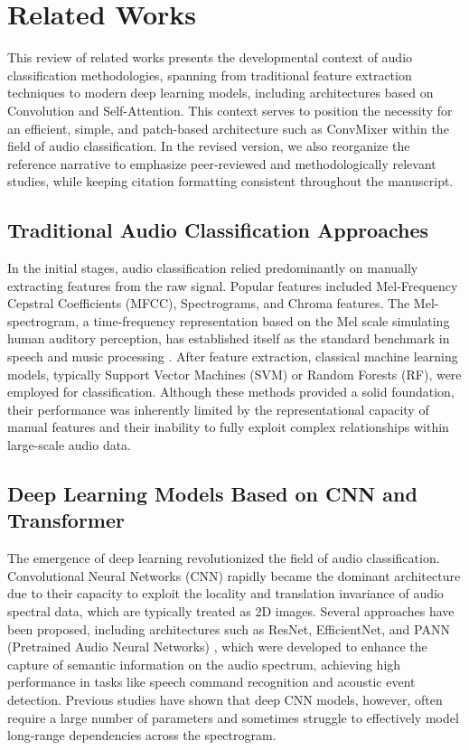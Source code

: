 \section*{Related Works}

This review of related works presents the developmental context of audio classification methodologies, spanning from traditional feature extraction techniques to modern deep learning models, including architectures based on Convolution and Self-Attention. This context serves to position the necessity for an efficient, simple, and patch-based architecture such as ConvMixer within the field of audio classification.
In the revised version, we also reorganize the reference narrative to emphasize peer-reviewed and methodologically relevant studies, while keeping citation formatting consistent throughout the manuscript.

\subsection*{Traditional Audio Classification Approaches}

In the initial stages, audio classification relied predominantly on manually extracting features from the raw signal. Popular features included Mel-Frequency Cepstral Coefficients (MFCC), Spectrograms, and Chroma features. The Mel-spectrogram, a time-frequency representation based on the Mel scale simulating human auditory perception, has established itself as the standard benchmark in speech and music processing \cite{Stevens1937MelScale}. After feature extraction, classical machine learning models, typically Support Vector Machines (SVM) or Random Forests (RF), were employed for classification. Although these methods provided a solid foundation, their performance was inherently limited by the representational capacity of manual features and their inability to fully exploit complex relationships within large-scale audio data.

\subsection*{Deep Learning Models Based on CNN and Transformer}

The emergence of deep learning revolutionized the field of audio classification. Convolutional Neural Networks (CNN) rapidly became the dominant architecture due to their capacity to exploit the locality and translation invariance of audio spectral data, which are typically treated as 2D images. Several approaches have been proposed, including architectures such as ResNet, EfficientNet, and PANN (Pretrained Audio Neural Networks) \cite{Wightman2021ResNet, Kong2020PANNs}, which were developed to enhance the capture of semantic information on the audio spectrum, achieving high performance in tasks like speech command recognition and acoustic event detection. Previous studies have shown that deep CNN models, however, often require a large number of parameters and sometimes struggle to effectively model long-range dependencies across the spectrogram.

